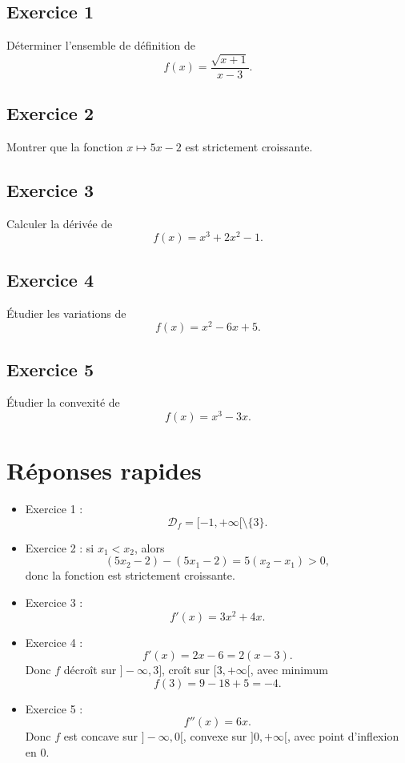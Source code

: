 \documentclass[11pt,a4paper]{article}
\newcommand{\D}{\mathcal{D}}
\begin{document}
\subsection*{Exercice 1}
Déterminer l'ensemble de définition de
\[
f(x)=\frac{\sqrt{x+1}}{x-3}.
\]

\subsection*{Exercice 2}
Montrer que la fonction \(x\mapsto 5x-2\) est strictement croissante.

\subsection*{Exercice 3}
Calculer la dérivée de
\[
f(x)=x^3+2x^2-1.
\]

\subsection*{Exercice 4}
Étudier les variations de
\[
f(x)=x^2-6x+5.
\]

\subsection*{Exercice 5}
Étudier la convexité de
\[
f(x)=x^3-3x.
\]

\section*{Réponses rapides}

\begin{itemize}
    \item Exercice 1 :
    \[
    \D_f=[-1,+\infty[\setminus\{3\}.
    \]

    \item Exercice 2 :
    si \(x_1<x_2\), alors
    \[
    (5x_2-2)-(5x_1-2)=5(x_2-x_1)>0,
    \]
    donc la fonction est strictement croissante.

    \item Exercice 3 :
    \[
    f'(x)=3x^2+4x.
    \]

    \item Exercice 4 :
    \[
    f'(x)=2x-6=2(x-3).
    \]
    Donc \(f\) décroît sur \(]-\infty,3]\), croît sur \([3,+\infty[\), avec minimum
    \[
    f(3)=9-18+5=-4.
    \]

    \item Exercice 5 :
    \[
    f''(x)=6x.
    \]
    Donc \(f\) est concave sur \(]-\infty,0[\), convexe sur \(]0,+\infty[\), avec point d'inflexion en \(0\).
\end{itemize}
\end{document}
